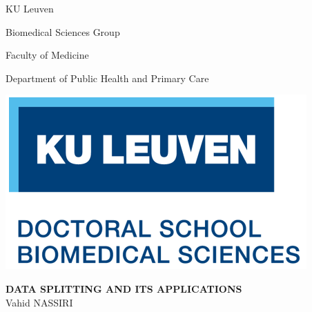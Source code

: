 \begin{titlepage}
{\selectfont
\vspace*{-2.9cm}
{
\centerline{KU Leuven \hfill }
\centerline{Biomedical Sciences Group \hfill }
\centerline{Faculty of Medicine \hfill } 
\centerline{Department of Public Health and Primary Care \hfill } }
\vspace*{-2.2cm}
\hspace{2cm}
\centerline{\phantom{tram 9}\hfill \includegraphics{./logodoctschool.png} }


\begin{minipage}{1.2\textwidth}													%
\begin{flushleft} %
\vspace{2cm}
\hspace{1cm}\textbf{\Large{DATA SPLITTING AND ITS APPLICATIONS}} \\

\vspace{0.7cm}
\hspace{1cm}\large{Vahid NASSIRI}
\end{flushleft}																	
\end{minipage}	

}
\end{titlepage}
